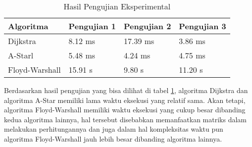 \renewcommand{\arraystretch}{1.8}
\begin{table}[H]
\centering
\caption{Hasil Pengujian Eksperimental}
\label{tab:hasiluji}
{\large
\begin{tabular}{|l|l|l|l|}
\hline
\textbf{Algoritma} & \textbf{Pengujian 1} & \textbf{Pengujian 2} & \textbf{Pengujian 3} \\ \hline
Dijkstra           & 8.12 ms              & 17.39 ms             & 3.86 ms              \\ \hline
A-Starl            & 5.48 ms              & 4.24 ms              & 4.75 ms              \\ \hline
Floyd-Warshall     & 15.91 s              & 9.80 s               & 11.20 s              \\ \hline
\end{tabular}
}
\end{table}

\noindent
Berdasarkan hasil pengujian yang bisa dilihat di tabel \ref{tab:hasiluji}, algoritma Dijkstra dan algoritma A-Star memiliki lama waktu eksekusi yang relatif sama. Akan tetapi, algoritma Floyd-Warshall memiliki waktu eksekusi yang cukup besar dibanding kedua algoritma lainnya, hal tersebut disebabkan memanfaatkan matriks dalam melakukan perhitungannya dan juga dalam hal kompleksitas waktu pun algoritma Floyd-Warshall jauh lebih besar dibanding algoritma lainnya.